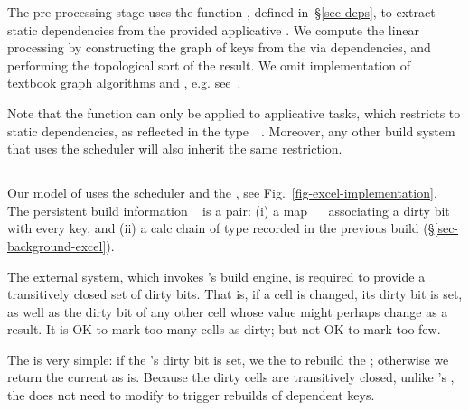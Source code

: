 The pre-processing stage uses the function , defined
in~\S\ref{sec-deps}, to extract static dependencies from the provided
applicative . We compute the linear processing  by
constructing the graph of keys  from the  via
dependencies, and performing the topological sort of the result. We omit
implementation of textbook graph algorithms  and ,
e.g. see~\cite{cormen2001introduction}.

Note that the function  can only be applied to applicative
tasks, which restricts \Make to static dependencies, as reflected in the
type~~. Moreover, any other build system that uses
the  scheduler will also inherit the same restriction.

\subsection{\Excel}\label{sec-implementation-excel}

Our model of \Excel uses the  scheduler and the
, see Fig.~\ref{fig-excel-implementation}. The persistent
build information ~ is a pair: (i) a map
~\hs{->}~ associating a dirty bit with every key, and (ii) a
calc chain of type \hs{[@@k]} recorded in the previous build
(\S\ref{sec-background-excel}).

The external system, which invokes \Excel's build engine, is required
to provide a transitively closed set of dirty bits. That is, if a
cell is changed, its dirty bit is set, as well as the dirty bit of any other
cell whose value might perhaps change as a result. It is OK to mark too many
cells as dirty; but not OK to mark too few.

The  is very simple: if the 's dirty bit is set,
we  the  to rebuild the ; otherwise we return the
current  as is.
Because the dirty cells are transitively closed,
unlike \Make's , the  does
not need to modify  to trigger rebuilds of dependent keys.

